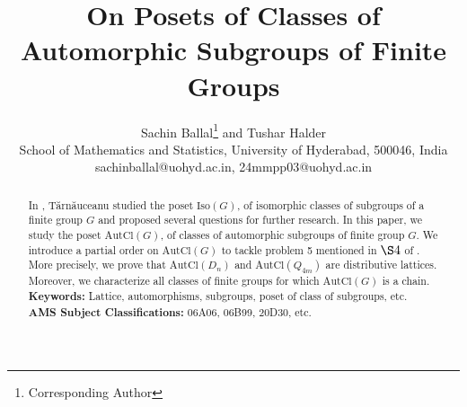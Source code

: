 \documentclass{article}
\date{}
\title{On Posets of Classes of Automorphic Subgroups of Finite Groups }
\author{Sachin Ballal\footnote{Corresponding Author} \hspace{0.1cm}and Tushar Halder \vspace{0.2cm}\\ School of Mathematics and Statistics, University of Hyderabad, 500046, India \\ sachinballal@uohyd.ac.in, 24mmpp03@uohyd.ac.in }
\theoremstyle{definition}
\providecommand{\keywords}[1]
{
  \small	
  \textbf{{Keywords:}} #1
}
\begin{document}
\maketitle
\begin{abstract}
     In \cite{tarnauceanu2015posetsclassesisomorphicsubgroups}, Tărnăuceanu studied the poset $\text{Iso}(G)$, of isomorphic classes of subgroups of a finite group $G$ and proposed several questions for further research. In this paper, we study the poset $\text{AutCl}(G)$, of classes of automorphic subgroups of finite group $G$. We introduce a partial order on $\text{AutCl}(G)$ to tackle problem 5 mentioned in $\S4$ of \cite{tarnauceanu2015posetsclassesisomorphicsubgroups}. More precisely, we prove that $\text{AutCl}(D_n)$ and $\text{AutCl}(Q_{4m})$ are distributive lattices. Moreover, we characterize all classes of finite groups for which $\text{AutCl}(G)$ is a chain. \vspace{0.2cm}\\
    \keywords{ Lattice, automorphisms, subgroups, poset of class of subgroups, etc.}\\
    \textbf{AMS Subject Classifications:} 06A06, 06B99, 20D30, etc. 
    
\end{abstract}
\end{document}
